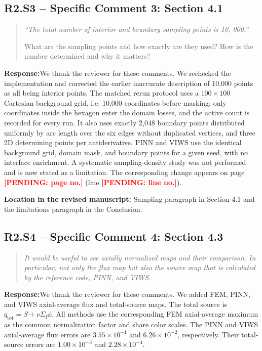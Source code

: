 \documentclass[11pt,a4paper]{article}
\newenvironment{reviewercomment}{\begin{quote}\small\itshape\color{commentgray}}{\end{quote}}
\newcommand{\authorresponse}{\noindent\textbf{Response:}\quad}
\newcommand{\revisionlocation}[1]{\par\noindent\textcolor{locationblue}{\textbf{Location in the revised manuscript: }}#1}
\newcommand{\draftplaceholder}[1]{\textcolor{red}{\textbf{[PENDING: #1]}}}
\begin{document}
\subsection*{R2.S3 -- Specific Comment 3: Section 4.1}
\begin{reviewercomment}
``The total number of interior and boundary sampling points is 10, 000.''

What are the sampling points and how exactly are they used? How is the number determined and why it matters?
\end{reviewercomment}
\authorresponse We thank the reviewer for these comments. We rechecked the implementation and corrected the earlier inaccurate description of 10,000 points as all being interior points. The matched rerun protocol uses a $100\times100$ Cartesian background grid, i.e. 10,000 coordinates before masking; only coordinates inside the hexagon enter the domain losses, and the active count is recorded for every run. It also uses exactly 2,048 boundary points distributed uniformly by arc length over the six edges without duplicated vertices, and three 2D determining points per antiderivative. PINN and VIWS use the identical background grid, domain mask, and boundary points for a given seed, with no interface enrichment. A systematic sampling-density study was not performed and is now stated as a limitation. The corresponding change appears on page \draftplaceholder{page no.} (line \draftplaceholder{line no.}).
\revisionlocation{Sampling paragraph in Section 4.1 and the limitations paragraph in the Conclusion.}

\subsection*{R2.S4 -- Specific Comment 4: Section 4.3}
\begin{reviewercomment}
It would be useful to see axially normalized maps and their comparison. In particular, not only the flux map but also the source map that is calculated by the reference code, PINN, and VIWS.
\end{reviewercomment}
\authorresponse We thank the reviewer for these comments. We added FEM, PINN, and VIWS axial-average flux and total-source maps. The total source is $q_{\mathrm{tot}}=S+\nu\Sigma_{\mathrm f}\phi$. All methods use the corresponding FEM axial-average maximum as the common normalization factor and share color scales. The PINN and VIWS axial-average flux errors are $3.55\times10^{-1}$ and $6.26\times10^{-2}$, respectively. Their total-source errors are $1.00\times10^{-3}$ and $2.28\times10^{-4}$.
\end{document}

